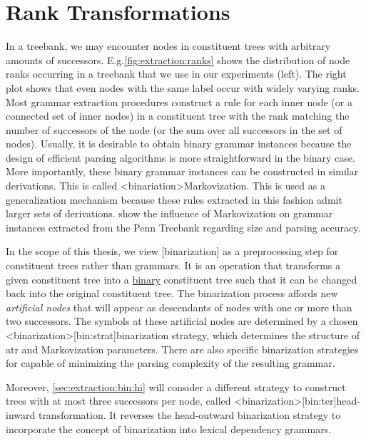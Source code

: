 \documentclass[../../document.tex]{subfiles}
\begin{document}
    \section{Rank Transformations}\label{sec:ranktransformations}
    In a treebank, we may encounter nodes in constituent trees with arbitrary amounts of successors.
    E.g.\@ \cref{fig:extraction:ranks} shows the distribution of node ranks occurring in a treebank that we use in our experiments (left). The right plot shows that even nodes with the same label occur with widely varying ranks.
    Most grammar extraction procedures construct a rule for each inner node (or a connected set of inner nodes) in a constituent tree with the rank matching the number of successors of the node (or the sum over all successors in the set of nodes).
    Usually, it is desirable to obtain binary grammar instances because the design of efficient parsing algorithms is more straightforward in the binary case.
    More importantly, these binary grammar instances can be constructed  in similar derivations. This is called <binariation>{Markovization}.
    This is used as a generalization mechanism because these rules extracted in this fashion admit larger sets of derivations.
    \citet[figure 2]{KleMan03} show the influence of Markovization on grammar instances extracted from the Penn Treebank regarding size and parsing accuracy.

    In the scope of this thesis, we view [binarization] as a preprocessing step for constituent trees rather than grammars.
    It is an operation that transforms a given constituent tree into a \hyperlink{binctree}{binary} constituent tree such that it can be changed back into the original constituent tree.
    The binarization process affords new \emph{artificial nodes} that will appear as descendants of nodes with one or more than two successors.
    The symbols at these artificial nodes are determined by a chosen <binarization>[bin:strat]{binarization strategy}, which determines the structure of atr and Markovization parameters. \citep{Son08,Cra12}
    There are also specific binarization strategies for  capable of minimizing the parsing complexity of the resulting grammar. \citep{Gil10}

    Moreover, \cref{sec:extraction:bin:hi} will consider a different strategy to construct trees with at most three successors per node, called <binarization>[bin:ter]{head-inward transformation}.
    It reverses the head-outward binarization strategy to incorporate the concept of binarization into lexical dependency grammars.
\end{document}
